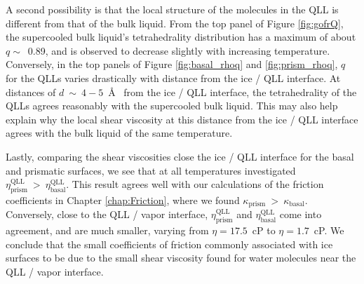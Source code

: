 A second possibility is that the local structure of the molecules in
the QLL is different from that of the bulk liquid. From the top panel
of Figure \ref{fig:gofrQ}, the supercooled bulk liquid's
tetrahedrality distribution has a maximum of about $q \sim$~0.89, and
is observed to decrease slightly with increasing
temperature. Conversely, in the top panels of Figure
\ref{fig:basal_rhoq} and \ref{fig:prism_rhoq}, $q$ for the QLLs varies
drastically with distance from the ice / QLL interface. At distances
of $d~\sim~4 - 5$~\AA~ from the ice / QLL interface, the
tetrahedrality of the QLLs agrees reasonably with the supercooled bulk
liquid. This may also help explain why the local shear viscosity at
this distance from the ice / QLL interface agrees with the bulk liquid
of the same temperature. 

Lastly, comparing the shear viscosities close the ice / QLL interface
for the basal and prismatic surfaces, we see that at all temperatures
investigated
$\eta_{\mathrm{prism}}^{\mathrm{QLL}}~>~\eta_{\mathrm{basal}}^{\mathrm{QLL}}$. This
result agrees well with our calculations of the friction coefficients
in Chapter \ref{chap:Friction}, where we found
$\kappa_{\mathrm{prism}}~ >~\kappa_{\mathrm{basal}}$. Conversely,
close to the QLL / vapor interface,
$\eta_{\mathrm{prism}}^{\mathrm{QLL}}$ and
$\eta_{\mathrm{basal}}^{\mathrm{QLL}}$ come into agreement, and are
much smaller, varying from $\eta = 17.5$~cP to $\eta = 1.7$~cP. We
conclude that the small coefficients of friction commonly associated
with ice surfaces to be due to the small shear viscosity found for
water molecules near the QLL / vapor interface. 






